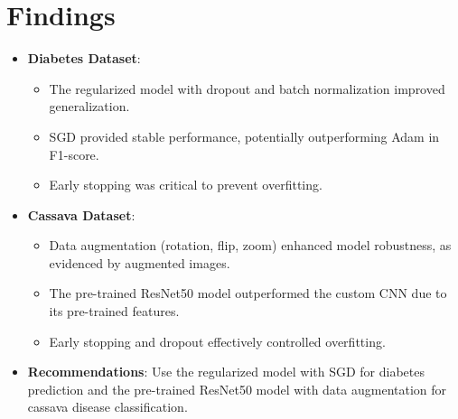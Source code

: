 \documentclass[a4paper,12pt]{article}
\begin{document}
\section*{Findings}
\begin{itemize}
    \item \textbf{Diabetes Dataset}:
    \begin{itemize}
        \item The regularized model with dropout and batch normalization improved generalization.
        \item SGD provided stable performance, potentially outperforming Adam in F1-score.
        \item Early stopping was critical to prevent overfitting.
    \end{itemize}
    \item \textbf{Cassava Dataset}:
    \begin{itemize}
        \item Data augmentation (rotation, flip, zoom) enhanced model robustness, as evidenced by augmented images.
        \item The pre-trained ResNet50 model outperformed the custom CNN due to its pre-trained features.
        \item Early stopping and dropout effectively controlled overfitting.
    \end{itemize}
    \item \textbf{Recommendations}: Use the regularized model with SGD for diabetes prediction and the pre-trained ResNet50 model with data augmentation for cassava disease classification.
\end{itemize}

\clearpage %
\end{document}
